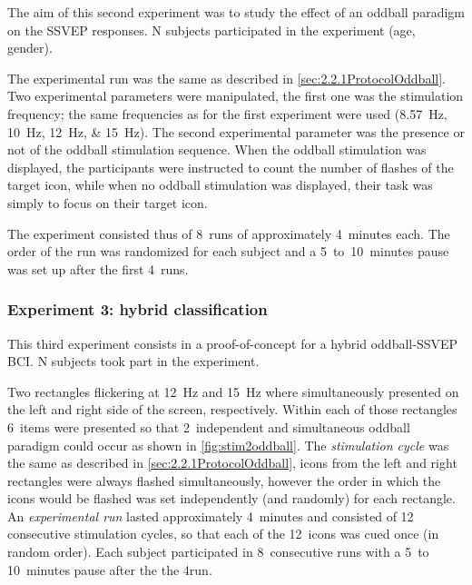 \documentclass[10pt]{article}
\begin{document}
        The aim of this second experiment was to study the effect of an oddball paradigm on the \ac{SSVEP} responses.
        N subjects participated in the experiment (age, gender).

        The experimental run was the same as described in \autoref{sec:2.2.1ProtocolOddball}.
        Two experimental parameters were manipulated, the first one was the stimulation frequency; the same frequencies as for the first experiment were used (\SIlist[list-units = single]{8.57;10;12;15}{\Hz}).
        The second experimental parameter was the presence or not of the oddball stimulation sequence.
        When the oddball stimulation was displayed, the participants were instructed to count the number of flashes of the target icon, while when no oddball stimulation was displayed, their task was simply to focus on their target icon.

        The experiment consisted thus of 8~runs of approximately 4~minutes each.
        The order of the run was randomized for each subject and a 5~to~10~minutes pause was set up after the first 4~runs.


        \subsubsection{Experiment 3: hybrid classification}
        \label{sec:2.2.3ProtocolHybrid}

        This third experiment consists in a proof-of-concept for a hybrid oddball-\ac{SSVEP} \ac{BCI}.
        N subjects took part in the experiment.

        Two rectangles flickering at \SI{12}{\Hz} and \SI{15}{\Hz} where simultaneously presented on the left and right side of the screen, respectively.
        Within each of those rectangles 6~items were presented so that 2~independent and simultaneous oddball paradigm could occur as shown in \autoref{fig:stim2oddball}.
        The \emph{stimulation cycle} was the same as described in \autoref{sec:2.2.1ProtocolOddball}, icons from the left and right rectangles were always flashed simultaneously, however the order in which the icons would be flashed was set independently (and randomly) for each rectangle.
        An \emph{experimental run} lasted approximately 4~minutes and consisted of 12 consecutive stimulation cycles, so that each of the 12~icons was cued once (in random order).
        Each subject participated in 8~consecutive runs with a 5~to 10~minutes pause after the the 4\nth run.
\end{document}
